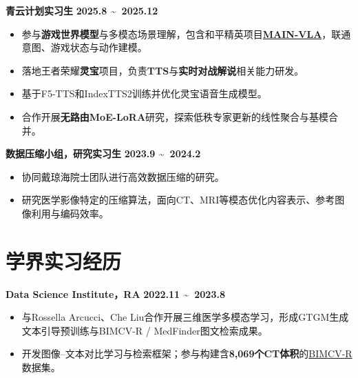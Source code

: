 \documentclass{resume}
\begin{document}
\begin{flushleft}
\textbf{\fangsong 青云计划实习生} \hfill \textbf{2025.8 \textasciitilde \ 2025.12}
\end{flushleft}
\begin{itemize}
    \item \kaishu 参与\textbf{游戏世界模型}与多模态场景理解，包含和平精英项目\href{https://main-vla.github.io/}{\textbf{MAIN-VLA}}，联通意图、游戏状态与动作建模。
    \item \kaishu 落地王者荣耀\textbf{灵宝}项目，负责\textbf{TTS}与\textbf{实时对战解说}相关能力研发。
    \item \kaishu 基于F5-TTS和IndexTTS2训练并优化灵宝语音生成模型。
    \item \kaishu 合作开展\textbf{无路由MoE-LoRA}研究，探索低秩专家更新的线性聚合与基模合并。
\end{itemize}

\begin{flushleft}
\textbf{\fangsong 数据压缩小组，研究实习生} \hfill \textbf{2023.9 \textasciitilde \ 2024.2}
\end{flushleft}
\begin{itemize}
    \item \kaishu 协同戴琼海院士团队进行高效数据压缩的研究。
    \item \kaishu 研究医学影像特定的压缩算法，面向CT、MRI等模态优化内容表示、参考图像利用与编码效率。
\end{itemize}

\section{\makebox[.75em][c]{\faUniversity} \textbf{\fangsong 学界实习经历}}
\begin{flushleft}
\textbf{\fangsong Data Science Institute，RA} \hfill \textbf{2022.11 \textasciitilde \ 2023.8}
\end{flushleft}
\begin{itemize}
    \item \kaishu 与Rossella Arcucci、Che Liu合作开展三维医学多模态学习，形成GTGM生成文本引导预训练与BIMCV-R / MedFinder图文检索成果。
    \item \kaishu 开发图像--文本对比学习与检索框架；参与构建含\textbf{8,069个CT体积}的\href{https://github.com/ydchen0806/MedFinder}{BIMCV-R}数据集。
\end{itemize}
\end{document}
